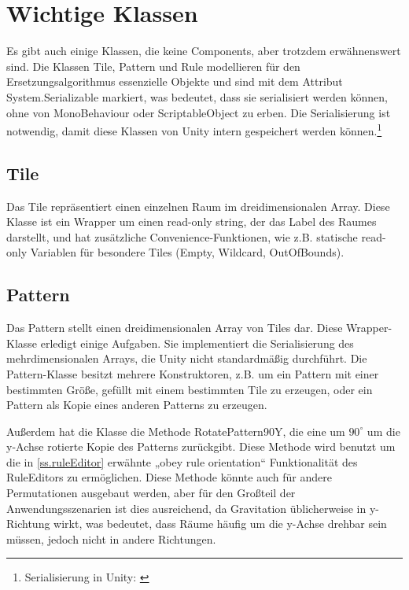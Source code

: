 
\section{Wichtige Klassen}

Es gibt auch einige Klassen, die keine Components, aber trotzdem erwähnenswert sind. Die Klassen Tile, Pattern und Rule modellieren für den Ersetzungsalgorithmus essenzielle Objekte und sind mit dem Attribut System.Serializable markiert, was bedeutet, dass sie serialisiert werden können, ohne von MonoBehaviour oder ScriptableObject zu erben. Die Serialisierung ist notwendig, damit diese Klassen von Unity intern gespeichert werden können.\footnote{Serialisierung in Unity: \cite[Seite: script-Serialization]{unityManual}}

\subsection{Tile}

Das Tile repräsentiert einen einzelnen Raum im dreidimensionalen Array. Diese Klasse ist ein Wrapper um einen read-only string, der das Label des Raumes darstellt, und hat zusätzliche Convenience-Funktionen, wie z.B. statische read-only Variablen für besondere Tiles (Empty, Wildcard, OutOfBounds).

\subsection{Pattern}

Das Pattern stellt einen dreidimensionalen Array von Tiles dar. Diese Wrapper-Klasse erledigt einige Aufgaben. Sie implementiert die Serialisierung des mehrdimensionalen Arrays, die Unity nicht standardmäßig durchführt. Die Pattern-Klasse besitzt mehrere Konstruktoren, z.B. um ein Pattern mit einer bestimmten Größe, gefüllt mit einem bestimmten Tile zu erzeugen, oder ein Pattern als Kopie eines anderen Patterns zu erzeugen. 

Außerdem hat die Klasse die Methode RotatePattern90Y, die eine um $ 90^\circ $ um die y-Achse rotierte Kopie des Patterns zurückgibt. Diese Methode wird benutzt um die in \ref{ss.ruleEditor} erwähnte „obey rule orientation“ Funktionalität des RuleEditors zu ermöglichen. Diese Methode könnte auch für andere Permutationen ausgebaut werden, aber für den Großteil der Anwendungsszenarien ist dies ausreichend, da Gravitation üblicherweise in y-Richtung wirkt, was bedeutet, dass Räume häufig um die y-Achse drehbar sein müssen, jedoch nicht in andere Richtungen.

